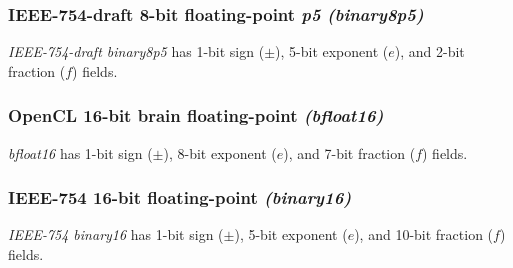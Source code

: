 \begin{samepage}
\subsubsection{IEEE-754-draft 8-bit floating-point \emph{p5} \emph{(binary8p5)}}

\emph{IEEE-754-draft binary8p5} has 1-bit sign ($\pm$), 5-bit exponent ($e$),
and 2-bit fraction ($f$) fields.

\vspace{0.5em}

\par\noindent
{}
\end{samepage}

\begin{samepage}
\subsubsection{OpenCL 16-bit brain floating-point \emph{(bfloat16)}}

\emph{bfloat16} has 1-bit sign ($\pm$), 8-bit exponent ($e$),
and 7-bit fraction ($f$) fields.

\vspace{0.5em}

\par\noindent
{}
\end{samepage}

\begin{samepage}
\subsubsection{IEEE-754 16-bit floating-point \emph{(binary16)}}

\emph{IEEE-754 binary16} has 1-bit sign ($\pm$), 5-bit exponent ($e$),
and 10-bit fraction ($f$) fields.

\vspace{0.5em}

\par\noindent
{}
\end{samepage}

